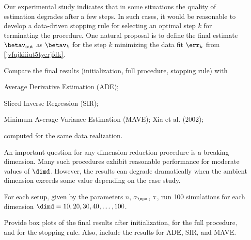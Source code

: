 Our experimental study indicates that in some situations the quality of estimation 
degrades after a few steps.
In such cases, it would be reasonable to develop a data-driven stopping rule for selecting 
an optimal step \( k \) for terminating the procedure. 
One natural proposal is to define the final estimate \( \betav_{\outp} \) 
as \( \betav_{k} \) for the step \( k \) minimizing the data fit 
\( \err_{k} \) from \eqref{jvfujkiiiut5tyerjfdk}.

{\color{blue} 
Compare the final results (initialization, full procedure, stopping rule) with 
\begin{mylist}
\item
Average Derivative Estimation (ADE);
\item
Sliced Inverse Regression (SIR);
\item
Minimum Average Variance Estimation (MAVE); Xia et al. (2002);
\end{mylist}
computed for the same data realization.
}


An important question for any dimension-reduction procedure is a breaking dimension.
Many such procedures exhibit reasonable performance for moderate values of \( \dimd \).
However, the results can degrade dramatically when the ambient dimension exceeds some value
depending on the case study. 

{\color{blue} 
For each setup, given by the parameters \( n \), \( \sigma_{\eps} \), \( \tau \),
run 100 simulations for each dimension \( \dimd = 10, 20, 30, 40, \ldots, 100 \).

Provide box plots of the final results 
after initialization, for the full procedure, and for the stopping rule.
Also, include the results for ADE, SIR, and MAVE. 
%
%
}



